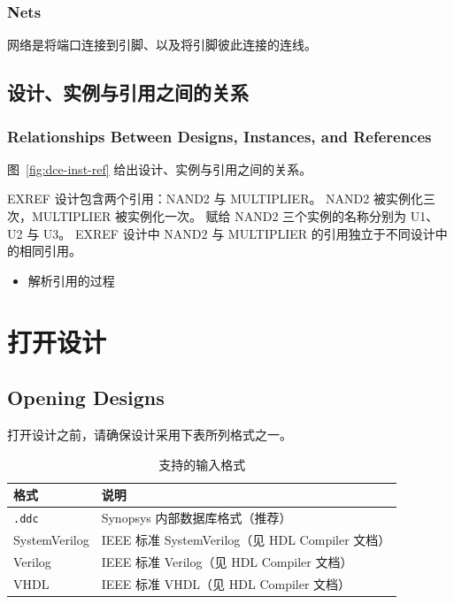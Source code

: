 \subsubsection*{Nets}

网络是将端口连接到引脚、以及将引脚彼此连接的连线。

\subsection{设计、实例与引用之间的关系}
\subsubsection*{Relationships Between Designs, Instances, and References}

图~\ref{fig:dce-inst-ref} 给出设计、实例与引用之间的关系。


EXREF 设计包含两个引用：NAND2 与 MULTIPLIER。
NAND2 被实例化三次，MULTIPLIER 被实例化一次。
赋给 NAND2 三个实例的名称分别为 U1、U2 与 U3。
EXREF 设计中 NAND2 与 MULTIPLIER 的引用独立于不同设计中的相同引用。

\begin{seeAlsoBox}
\begin{itemize}
  \item 解析引用的过程
\end{itemize}
\end{seeAlsoBox}

\section{打开设计}
\subsection*{Opening Designs}

打开设计之前，请确保设计采用下表所列格式之一。

\begin{table}[htbp]
\centering
\caption{支持的输入格式}
\label{tab:dce-input-fmt}
\begin{tabular}{@{}ll@{}}
\toprule
格式 & 说明 \\
\midrule
\texttt{.ddc} & Synopsys 内部数据库格式（推荐） \\
SystemVerilog & IEEE 标准 SystemVerilog（见 HDL Compiler 文档） \\
Verilog & IEEE 标准 Verilog（见 HDL Compiler 文档） \\
VHDL & IEEE 标准 VHDL（见 HDL Compiler 文档） \\
\bottomrule
\end{tabular}
\end{table}

